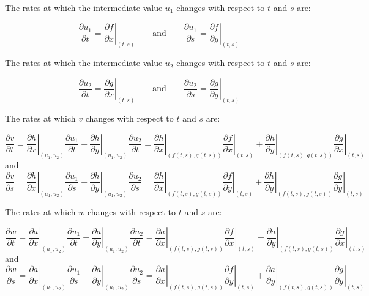 \documentclass{article}
\begin{document}
The rates at which the intermediate value \(u_1\) changes with respect to \(t\) and \(s\) are:

\[\frac{\partial u_1}{\partial t} = \left.\frac{\partial f}{\partial x}\right|_{(t,s)} \quad\quad\text{and}\quad\quad \frac{\partial u_1}{\partial s} = \left.\frac{\partial f}{\partial y}\right|_{(t,s)}\]

The rates at which the intermediate value \(u_2\) changes with respect to \(t\) and \(s\) are:

\[\frac{\partial u_2}{\partial t} = \left.\frac{\partial g}{\partial x}\right|_{(t,s)} \quad\quad\text{and}\quad\quad \frac{\partial u_2}{\partial s} = \left.\frac{\partial g}{\partial y}\right|_{(t,s)}\]

The rates at which \(v\) changes with respect to \(t\) and \(s\) are: 

\[\frac{\partial v}{\partial t} = \left.\frac{\partial h}{\partial x}\right|_{(u_1,u_2)} \frac{\partial u_1}{\partial t} + \left.\frac{\partial h}{\partial y}\right|_{(u_1,u_2)} \frac{\partial u_2}{\partial t} = \left.\frac{\partial h}{\partial x}\right|_{(f(t,s),g(t,s))} \left.\frac{\partial f}{\partial x}\right|_{(t,s)} + \left.\frac{\partial h}{\partial y}\right|_{(f(t,s),g(t,s))} \left.\frac{\partial g}{\partial x}\right|_{(t,s)}\] 
and 
\[\frac{\partial v}{\partial s} = \left.\frac{\partial h}{\partial x}\right|_{(u_1,u_2)} \frac{\partial u_1}{\partial s} + \left.\frac{\partial h}{\partial y}\right|_{(u_1,u_2)} \frac{\partial u_2}{\partial s} = \left.\frac{\partial h}{\partial x}\right|_{(f(t,s),g(t,s))} \left.\frac{\partial f}{\partial y}\right|_{(t,s)} + \left.\frac{\partial h}{\partial y}\right|_{(f(t,s),g(t,s))} \left.\frac{\partial g}{\partial y}\right|_{(t,s)}\] 

The rates at which \(w\) changes with respect to \(t\) and \(s\) are:

\[\frac{\partial w}{\partial t} = \left.\frac{\partial a}{\partial x}\right|_{(u_1,u_2)} \frac{\partial u_1}{\partial t} + \left.\frac{\partial a}{\partial y}\right|_{(u_1,u_2)} \frac{\partial u_2}{\partial t} = \left.\frac{\partial a}{\partial x}\right|_{(f(t,s),g(t,s))} \left.\frac{\partial f}{\partial x}\right|_{(t,s)} + \left.\frac{\partial a}{\partial y}\right|_{(f(t,s),g(t,s))} \left.\frac{\partial g}{\partial x}\right|_{(t,s)}\] 
and 
\[\frac{\partial w}{\partial s} = \left.\frac{\partial a}{\partial x}\right|_{(u_1,u_2)} \frac{\partial u_1}{\partial s} + \left.\frac{\partial a}{\partial y}\right|_{(u_1,u_2)} \frac{\partial u_2}{\partial s} = \left.\frac{\partial a}{\partial x}\right|_{(f(t,s),g(t,s))} \left.\frac{\partial f}{\partial y}\right|_{(t,s)} + \left.\frac{\partial a}{\partial y}\right|_{(f(t,s),g(t,s))} \left.\frac{\partial g}{\partial y}\right|_{(t,s)}\] 
\end{document}
